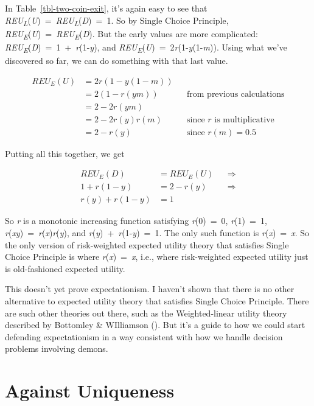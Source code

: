 \documentclass[
  12pt,
  letterpaper,
  DIV=11,
  numbers=noendperiod]{scrreprt}
\begin{document}
In Table~\ref{tbl-two-coin-exit}, it's again easy to see that
\emph{REU\textsubscript{L}}(\emph{U})~=~\emph{REU\textsubscript{L}}(\emph{D})~=~1.
So by Single Choice Principle,
\emph{REU\textsubscript{E}}(\emph{U})~=~\emph{REU\textsubscript{E}}(\emph{D}).
But the early values are more complicated:
\emph{REU\textsubscript{E}}(\emph{D})~=~1~+~\emph{r}(1-\emph{y}), and
\emph{REU\textsubscript{E}}(\emph{U})~=~2\emph{r}(1-\emph{y}(1-\emph{m})).
Using what we've discovered so far, we can do something with that last
value.

\begin{align*}
REU_E(U) &= 2r(1-y(1-m)) \\
  &= 2(1-r(ym))  && \text{from previous calculations} \\
  &= 2 - 2r(ym) \\
  &= 2 - 2r(y)r(m) && \text{since $r$ is multiplicative} \\
  &= 2 - r(y)  && \text{since $r(m) = 0.5$}
\end{align*}

Putting all this together, we get

\begin{align*}
REU_E(D) &= REU_E(U)  && \Rightarrow \\
1 + r(1-y) &= 2 - r(y) && \Rightarrow \\
r(y) + r(1-y) &= 1
\end{align*}

So \emph{r} is a monotonic increasing function satisfying
\emph{r}(0)~=~0, \emph{r}(1)~=~1,
\emph{r}(\emph{xy})~=~\emph{r}(\emph{x})\emph{r}(\emph{y}), and
\emph{r}(\emph{y})~+~\emph{r}(1-\emph{y})~=~1. The only such function is
\emph{r}(\emph{x})~=~\emph{x}. So the only version of risk-weighted
expected utility theory that satisfies Single Choice Principle is where
\emph{r}(\emph{x})~=~\emph{x}, i.e., where risk-weighted expected
utility just is old-fashioned expected utility.

This doesn't yet prove expectationism. I haven't shown that there is no
other alternative to expected utility theory that satisfies Single
Choice Principle. There are such other theories out there, such as the
Weighted-linear utility theory described by Bottomley \& WIlliamson
(). But it's a guide to how we
could start defending expectationism in a way consistent with how we
handle decision problems involving demons.

\chapter{Against Uniqueness}\label{sec-unique}
\end{document}
